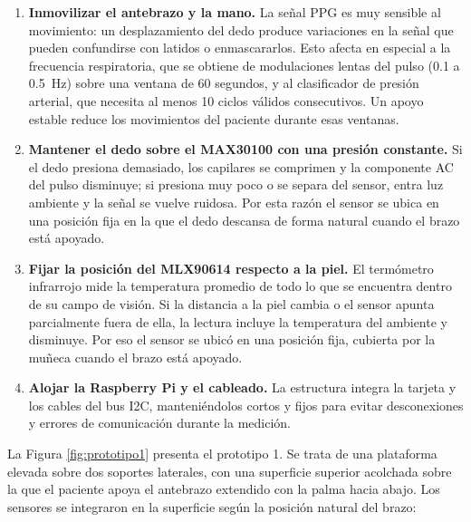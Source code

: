 \documentclass[11pt,a4paper]{article}
\begin{document}
\begin{enumerate}
    \item \textbf{Inmovilizar el antebrazo y la mano.} La señal PPG es muy sensible al movimiento: un desplazamiento del dedo produce variaciones en la señal que pueden confundirse con latidos o enmascararlos. Esto afecta en especial a la frecuencia respiratoria, que se obtiene de modulaciones lentas del pulso (0.1 a 0.5~Hz) sobre una ventana de 60 segundos, y al clasificador de presión arterial, que necesita al menos 10 ciclos válidos consecutivos. Un apoyo estable reduce los movimientos del paciente durante esas ventanas.

    \item \textbf{Mantener el dedo sobre el MAX30100 con una presión constante.} Si el dedo presiona demasiado, los capilares se comprimen y la componente AC del pulso disminuye; si presiona muy poco o se separa del sensor, entra luz ambiente y la señal se vuelve ruidosa. Por esta razón el sensor se ubica en una posición fija en la que el dedo descansa de forma natural cuando el brazo está apoyado.

    \item \textbf{Fijar la posición del MLX90614 respecto a la piel.} El termómetro infrarrojo mide la temperatura promedio de todo lo que se encuentra dentro de su campo de visión. Si la distancia a la piel cambia o el sensor apunta parcialmente fuera de ella, la lectura incluye la temperatura del ambiente y disminuye. Por eso el sensor se ubicó en una posición fija, cubierta por la muñeca cuando el brazo está apoyado.

    \item \textbf{Alojar la Raspberry Pi y el cableado.} La estructura integra la tarjeta y los cables del bus I2C, manteniéndolos cortos y fijos para evitar desconexiones y errores de comunicación durante la medición.
\end{enumerate}

La Figura \ref{fig:prototipo1} presenta el prototipo 1. Se trata de una plataforma elevada sobre dos soportes laterales, con una superficie superior acolchada sobre la que el paciente apoya el antebrazo extendido con la palma hacia abajo. Los sensores se integraron en la superficie según la posición natural del brazo:
\end{document}
